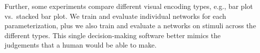 Further, some experiments compare different visual encoding types, e.g., bar plot vs.~stacked bar plot. We train and evaluate individual networks for each parameterization, plus we also train and evaluate a networks on stimuli across the different types. This single decision-making software better mimics the judgements that a human would be able to make. 
